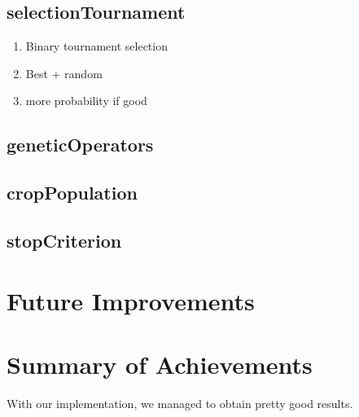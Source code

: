 
\subsection{selectionTournament} \label{selectionTournament}

\begin{enumerate}
	\item Binary tournament selection
	\item Best + random
	\item more probability if good
\end{enumerate}
\subsection{geneticOperators} \label{geneticOperators}
\subsection{cropPopulation} \label{cropPopulation}
\subsection{stopCriterion} \label{stopCriterion}

\section{Future Improvements}
\section{Summary of  Achievements}\label{summary}

With our implementation, we managed to obtain pretty good results. 
